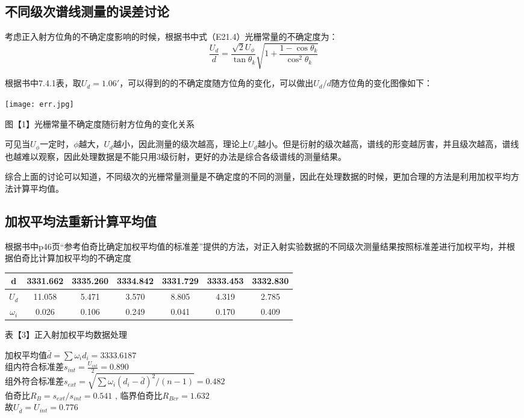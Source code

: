 \documentclass[8pt,a4paper,nocap]{ctexart}
\begin{document}
	\subsection{ 不同级次谱线测量的误差讨论}
	考虑正入射方位角的不确定度影响的时候，根据书中式（E21.4）光栅常量的不确定度为：
	\[\frac{U_d}{d} = \frac{\sqrt{2}U_\phi}{\tan\theta_k}\sqrt{1 + \frac{1 - \cos\theta_k}{\cos^2\theta_k}}\]
			
			根据书中7.4.1表，取\(U_d = 1.06'\)，可以得到的的不确定度随方位角的变化，可以做出\(U_d/d \)随方位角的变化图像如下：
			\begin{center}
				\texttt{[image: err.jpg]}
				
				{\footnotesize 图【1】光栅常量不确定度随衍射方位角的变化关系}
			\end{center}

		可见当\(U_\phi\)一定时，\(\phi\)越大，\(U_d\)越小，因此测量的级次越高，理论上\(U_d\)越小。但是衍射的级次越高，谱线的形变越厉害，并且级次越高，谱线也越难以观察，因此处理数据是不能只用3级衍射，更好的办法是综合各级谱线的测量结果。
			
			综合上面的讨论可以知道，不同级次的光栅常量测量是不确定度的不同的测量，因此在处理数据的时候，更加合理的方法是利用加权平均方法计算平均值。
	\subsection{加权平均法重新计算平均值}
根据书中p46页“参考伯奇比确定加权平均值的标准差”提供的方法，对正入射实验数据的不同级次测量结果按照标准差进行加权平均，并根据伯奇比计算加权平均的不确定度	
	\begin{center}
		\begin{tabular}{|c|c|c|c|c|c|c|}\hline
			d & 3331.662	& 3335.260 & 3334.842  &  3331.729 & 3333.453 & 3332.830 \\ \hline
			\(U_d\) & 11.058 & 5.471 & 3.570 & 8.805 & 4.319  & 2.785 \\ \hline
			\(\omega_i\) & 0.026 & 0.106 & 0.249 & 0.041 & 0.170 & 0.409	 \\ \hline
		\end{tabular}
		
		{\footnotesize  表【3】正入射加权平均数据处理}
	\end{center}
	加权平均值\(\bar{d} = \sum \omega_id_i = 3333.6187 \)\\
	组内符合标准差\(s_{int} = \frac{U_{int}}{2} = 0.890\)\\
	组外符合标准差\(s_{ext} = \sqrt{\sum\omega_i(d_i - \bar{d})^2/(n - 1)} = 0.482\)\\
	伯奇比\(R_B = s_{ext}/s_{int} = 0.541 \) ,  临界伯奇比\(R_{B cr} = 1.632\)\\
	故\(U_{\bar{d}} = U_{int} = 0.776\)
	
\end{document}
